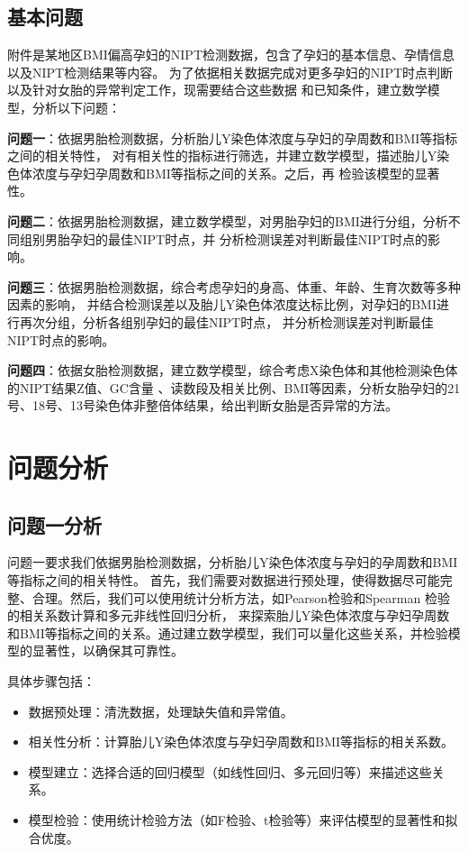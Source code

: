 \documentclass{cumcmthesis}
\begin{document}
        \subsection{基本问题}
        附件是某地区BMI偏高孕妇的NIPT检测数据，包含了孕妇的基本信息、孕情信息以及NIPT检测结果等内容。
        为了依据相关数据完成对更多孕妇的NIPT时点判断以及针对女胎的异常判定工作，现需要结合这些数据
        和已知条件，建立数学模型，分析以下问题：
        \par 
        \textbf{问题一}：依据男胎检测数据，分析胎儿Y染色体浓度与孕妇的孕周数和BMI等指标之间的相关特性，
        对有相关性的指标进行筛选，并建立数学模型，描述胎儿Y染色体浓度与孕妇孕周数和BMI等指标之间的关系。之后，再
        检验该模型的显著性。
        \par
        \textbf{问题二}：依据男胎检测数据，建立数学模型，对男胎孕妇的BMI进行分组，分析不同组别男胎孕妇的最佳NIPT时点，并
        分析检测误差对判断最佳NIPT时点的影响。
        \par
        \textbf{问题三}：依据男胎检测数据，综合考虑孕妇的身高、体重、年龄、生育次数等多种因素的影响，
        并结合检测误差以及胎儿Y染色体浓度达标比例，对孕妇的BMI进行再次分组，分析各组别孕妇的最佳NIPT时点，
        并分析检测误差对判断最佳NIPT时点的影响。
        \par
        \textbf{问题四}：依据女胎检测数据，建立数学模型，综合考虑X染色体和其他检测染色体的NIPT结果Z值、GC含量
        、读数段及相关比例、BMI等因素，分析女胎孕妇的21号、18号、13号染色体非整倍体结果，给出判断女胎是否异常的方法。
        \section{问题分析}
        \subsection{问题一分析}
        问题一要求我们依据男胎检测数据，分析胎儿Y染色体浓度与孕妇的孕周数和BMI等指标之间的相关特性。
        首先，我们需要对数据进行预处理，使得数据尽可能完整、合理。然后，我们可以使用统计分析方法，如Pearson检验和Spearman
        检验的相关系数计算和多元非线性回归分析，
        来探索胎儿Y染色体浓度与孕妇孕周数和BMI等指标之间的关系。通过建立数学模型，我们可以量化这些关系，并检验模型的显著性，以确保其可靠性。
        \par 具体步骤包括：
        \begin{itemize} 
            \item 数据预处理：清洗数据，处理缺失值和异常值。
            \item 相关性分析：计算胎儿Y染色体浓度与孕妇孕周数和BMI等指标的相关系数。
            \item 模型建立：选择合适的回归模型（如线性回归、多元回归等）来描述这些关系。
            \item 模型检验：使用统计检验方法（如F检验、t检验等）来评估模型的显著性和拟合优度。
        \end{itemize}
\end{document}
